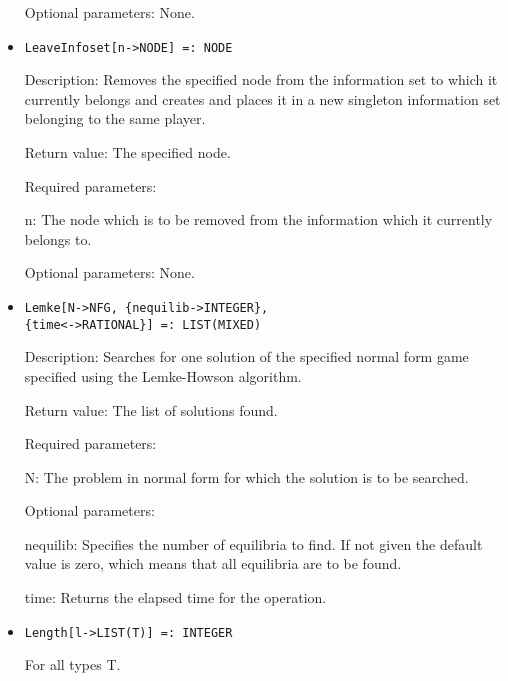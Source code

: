 \begin{itemize}
\item
[Optional parameters:] None.
\ed



\item
\protect \large \begin{verbatim}
LeaveInfoset[n->NODE] =: NODE
\end{verbatim}\normalsize

\bd
\item
[Description:] Removes the specified node from the information set to
which it currently belongs and creates and places it in a new
singleton information set belonging to the same player.
\item
[Return value:] The specified node.
\item
[Required parameters:]\hfil\null
	  
\bd
\item
[n:] The node which is to be removed from the information which it
currently belongs to.
\ed

\item
[Optional parameters:] None.
\ed

\item
\protect \large \begin{verbatim}
Lemke[N->NFG, {nequilib->INTEGER},
{time<->RATIONAL}] =: LIST(MIXED)
\end{verbatim}\normalsize

\bd
\item
[Description:] Searches for one solution of the specified normal form
game specified using the Lemke-Howson algorithm.
\item
[Return value:] The list of solutions found.
\item
[Required parameters:]\hfil\null

\bd
\item
[N:] The problem in normal form for which the solution is to be
searched.
\ed

\item
[Optional parameters:]\hfil\null

\bd
\item
[nequilib:] Specifies the number of equilibria to find.  If not given
the default value is zero, which means that all equilibria are to be
found.
\item
[time:] Returns the elapsed time for the operation.
\ed
\ed

\item
\protect \large \begin{verbatim}
Length[l->LIST(T)] =: INTEGER
\end{verbatim}\normalsize
For all types T.


\end{itemize}
